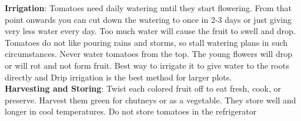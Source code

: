 \documentclass[12]{article}
\begin{document}
\textbf{\color{red}Irrigation}: Tomatoes need daily watering until they start flowering. From that point onwards you can cut down the watering to once in 2-3 days or just giving very less water every day. Too much water will cause the fruit to swell and drop. Tomatoes do not like pouring rains and storms, so stall watering plans in such circumstances. Never water tomatoes from the top. The young flowers will drop or will rot and not form fruit. Best way to irrigate it to give water to the roots directly and Drip irrigation is the best method for larger plots.\\

\textbf{\color{red}Harvesting and Storing}: Twist each colored fruit off to eat fresh, cook, or preserve. Harvest them green for chutneys or as a vegetable. They store well and longer in cool temperatures. Do not store tomatoes in the refrigerator
\end{document}
